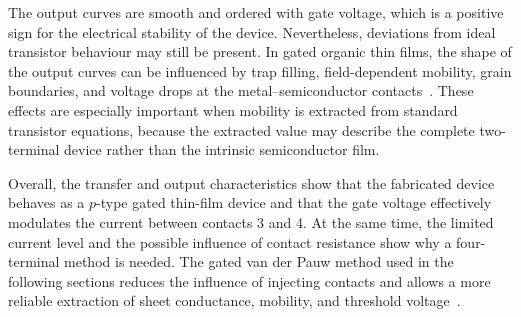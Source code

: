 The output curves are smooth and ordered with gate voltage, which is a positive sign for the electrical stability of the device. Nevertheless, deviations from ideal transistor behaviour may still be present. In gated organic thin films, the shape of the output curves can be influenced by trap filling, field-dependent mobility, grain boundaries, and voltage drops at the metal--semiconductor contacts~\cite{Sirringhaus2005DevicePhysics,Darwish2020DriftDiffusionOFET,Natali2012ChargeInjection}. These effects are especially important when mobility is extracted from standard transistor equations, because the extracted value may describe the complete two-terminal device rather than the intrinsic semiconductor film.

Overall, the transfer and output characteristics show that the fabricated device behaves as a $p$-type gated thin-film device and that the gate voltage effectively modulates the current between contacts 3 and 4. At the same time, the limited current level and the possible influence of contact resistance show why a four-terminal method is needed. The gated van der Pauw method used in the following sections reduces the influence of injecting contacts and allows a more reliable extraction of sheet conductance, mobility, and threshold voltage~\cite{Rolin2017GVDP,Lee2024GVDPIGZO}.
